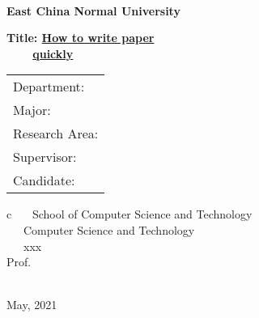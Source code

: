 \newpage

\pagestyle{empty}

\hspace*{\fill}{\large School Code: 10269}\\

\vskip 2cm

\begin{center}
	\fontsize{30pt}{1.1cm}\selectfont \textbf{East China Normal University}
\end{center}

\vskip 3cm

\begin{center}
{\erhao\bf  Title: \underline{How to write paper}~~~~~~}\\
{\erhao\bf  ~~~~\underline{quickly}}
\end{center}


\vskip 2cm {\large
\begin{center}
\begin{tabular}{l}
Department:\\
Major:\\
Research Area:\\
Supervisor:\\
Candidate:
\end{tabular}
\begin{tabular}c
~~~School of Computer Science and Technology \\
\hline ~~~Computer Science and Technology  \\
\hline ~~~xxx\\
\hline Prof.   \\
\hline {}  \\
\hline
\end{tabular}
\end{center}}

\vskip 30mm

\begin{center}
{\Large May, 2021}
\end{center}
